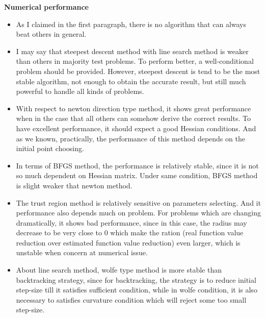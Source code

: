 \documentclass[11pt]{report}
\begin{document}
\begin{center}
    \textbf{Numerical performance}
\begin{itemize}
    \item As I claimed in the first paragraph, there is no algorithm that can always beat others in general. 
    \item I may say that steepest descent method with line search method is weaker than others in majority test problems. To perform better, a well-conditional problem should be provided. However, steepest descent is tend to be the most stable algorithm, not enough to obtain the accurate result, but still much powerful to handle all kinds of problems.
    \item With respect to newton direction type method, it shows great performance when in the case that all others can somehow derive the correct results. To have excellent performance, it should expect a good Hessian conditions. And as we known, practically, the performance of this method depends on the initial point choosing. 
    \item In terms of BFGS method, the performance is relatively stable, since it is not so much dependent on Hessian matrix. Under same condition, BFGS method is slight weaker that newton method.
    \item The trust region method is relatively sensitive on parameters selecting. And it performance also depends much on problem. For problems which are changing dramatically, it shows bad performance, since in this case, the radius may decrease to be very close to $0$ which make the ration (real function value reduction over estimated function value reduction) even larger, which is unstable when concern at numerical issue. 
    \item About line search method, wolfe type method is more stable than backtracking strategy, since for backtracking, the strategy is to reduce initial step-size till it satisfies sufficient condition, while in wolfe condition, it is also necessary to satisfies curvature condition which will reject some too small step-size. 
\end{itemize}
\end{center}
\end{document}
